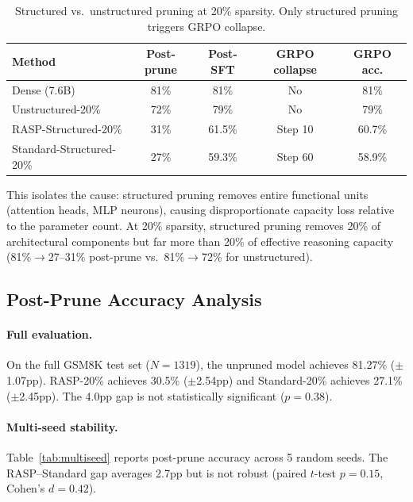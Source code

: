 \documentclass[11pt,a4paper]{article}
\begin{document}
\begin{table}[t]
\centering
\small
\caption{Structured vs.\ unstructured pruning at 20\% sparsity. Only structured pruning triggers GRPO collapse.}
\label{tab:struct_unstruct}
\begin{tabular}{lcccc}
\toprule
\textbf{Method} & \textbf{Post-prune} & \textbf{Post-SFT} & \textbf{GRPO collapse} & \textbf{GRPO acc.} \\
\midrule
Dense (7.6B) & 81\% & 81\% & No & 81\% \\
Unstructured-20\% & 72\% & 79\% & No & 79\% \\
RASP-Structured-20\% & 31\% & 61.5\% & Step 10 & 60.7\% \\
Standard-Structured-20\% & 27\% & 59.3\% & Step 60 & 58.9\% \\
\bottomrule
\end{tabular}
\end{table}

This isolates the cause: structured pruning removes entire functional units (attention heads, MLP neurons), causing disproportionate capacity loss relative to the parameter count. At 20\% sparsity, structured pruning removes 20\% of architectural components but far more than 20\% of effective reasoning capacity (81\%$\to$27--31\% post-prune vs.\ 81\%$\to$72\% for unstructured).

\subsection{Post-Prune Accuracy Analysis}
\label{sec:postprune}

\paragraph{Full evaluation.} On the full GSM8K test set ($N=1319$), the unpruned model achieves 81.27\% ($\pm$1.07pp). RASP-20\% achieves 30.5\% ($\pm$2.54pp) and Standard-20\% achieves 27.1\% ($\pm$2.45pp). The 4.0pp gap is not statistically significant ($p=0.38$).

\paragraph{Multi-seed stability.} Table~\ref{tab:multiseed} reports post-prune accuracy across 5 random seeds. The RASP--Standard gap averages 2.7pp but is not robust (paired $t$-test $p=0.15$, Cohen's $d=0.42$).
\end{document}
